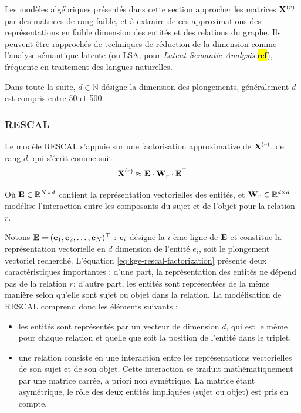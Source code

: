 Les modèles algébriques présentés dans cette section approcher les matrices $\bf{X}^{(r)}$ par des matrices de rang faible, et à extraire de ces approximations des représentations en faible dimension des entités et des relations du graphe. Ils peuvent être rapprochés de techniques de réduction de la dimension comme l'analyse sémantique latente (ou LSA, pour \textit{Latent Semantic Analysis} \hl{ref}), fréquente en traitement des langues naturelles.

Dans toute la suite, $d \in \mathbb{N}$ désigne la dimension des plongements, généralement $d$ est compris entre 50 et 500.

\subsubsection{RESCAL}

Le modèle RESCAL \cite{nickel2011learning} s'appuie sur une factorisation approximative de $\bf{X}^{(r)}$, de rang $d$, qui s'écrit comme suit  :
\begin{equation}
    \bf{X}^{(r)} \approx \bf{E} \cdot \bf{W}_r \cdot \bf{E}^\top
    \label{eq:kge-rescal-factorization}
\end{equation}

Où $\bf{E} \in \R^{N \times d}$ contient la représentation vectorielles des entités, et $\bf{W}_r \in \R^{d \times d}$ modélise l'interaction entre les composants du sujet et de l'objet pour la relation $r$.

Notons $\bf{E} = (\bf{e}_1, \bf{e}_2, \ldots, \bf{e}_N)^\top$ : $\bf{e}_i$ désigne la $i$-ème ligne de $\bf{E}$ et constitue la représentation vectorielle en $d$ dimension de l'entité $e_i$, soit le plongement vectoriel recherché. L'équation \ref{eq:kge-rescal-factorization} présente deux caractéristiques importantes : d'une part, la représentation des entités ne dépend pas de la relation $r$; d'autre part, les entités sont représentées de la même manière selon qu'elle sont sujet ou objet dans la relation. La modélisation de RESCAL comprend donc les éléments suivants :
\begin{itemize}
    \item les entités sont représentés par un vecteur de dimension $d$, qui est le même pour chaque relation et quelle que soit la position de l'entité dans le triplet. 
    \item une relation consiste en une interaction entre les représentations vectorielles de son sujet et de son objet. Cette interaction se traduit mathématiquement par une matrice carrée, a priori non symétrique. La matrice étant asymétrique, le rôle des deux entités impliquées (sujet ou objet) est pris en compte.
\end{itemize}


